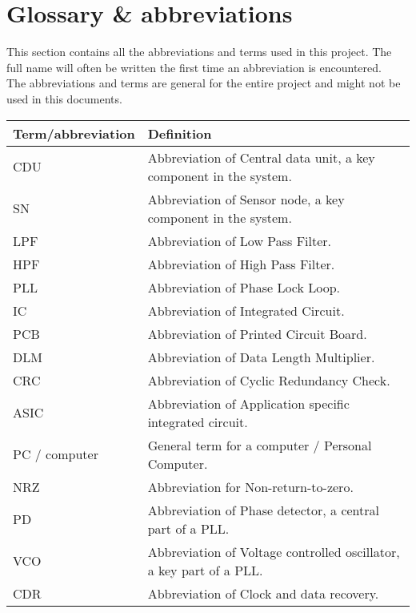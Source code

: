 \section{Glossary \& abbreviations}
This section contains all the abbreviations and terms used in this project. The full name will often be written the first time an abbreviation is encountered.\\
The abbreviations and terms are general for the entire project and might not be used in this documents.
\begin{table}[H]
\centering
\begin{tabular}{|p{4cm}|p{7cm}|}
\hline
Term/abbreviation & Definition\\ \hline
CDU & Abbreviation of Central data unit, a key component in the system.\\ \hline
SN & Abbreviation of Sensor node, a key component in the system.\\ \hline
LPF & Abbreviation of Low Pass Filter. \\ \hline
HPF & Abbreviation of High Pass Filter. \\ \hline
PLL & Abbreviation of Phase Lock Loop. \\ \hline
IC & Abbreviation of Integrated Circuit. \\ \hline
PCB & Abbreviation of Printed Circuit Board. \\ \hline
DLM & Abbreviation of Data Length Multiplier. \\ \hline
CRC & Abbreviation of Cyclic Redundancy Check. \\ \hline
ASIC & Abbreviation of Application specific integrated circuit.\\ \hline
PC / computer & General term for a computer / Personal Computer.\\ \hline
NRZ & Abbreviation for Non-return-to-zero.\\ \hline
PD & Abbreviation of Phase detector, a central part of a PLL.\\ \hline
VCO & Abbreviation of Voltage controlled oscillator, a key part of a PLL.\\ \hline
CDR & Abbreviation of Clock and data recovery. \\ \hline
\end{tabular}
\end{table}